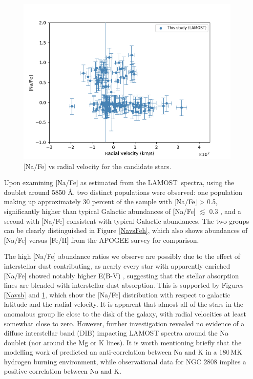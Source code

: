 \documentclass[a4paper,fleqn,usenatbib]{mnras}
\newcommand{\project}[1]{#1}
\newcommand{\lamost}{\project{LAMOST}}
\begin{document}
\begin{figure}
	\includegraphics[width=\columnwidth]{Navsradvel.png}
    \caption{[Na/Fe] vs radial velocity for the candidate stars.}
    \label{Navsradvel}
\end{figure}
Upon examining [Na/Fe] as estimated from the \lamost\ spectra, using the doublet around 5850 \AA, two distinct populations were observed: one population making up approximately 30 percent of the sample with [Na/Fe] > 0.5, significantly higher than typical Galactic abundances of [Na/Fe] $\lesssim$ 0.3 \citep{kobayashi2011}, and a second with [Na/Fe] consistent with typical Galactic abundances. The two groups can be clearly distinguished in Figure \ref{NavsFeh}, which also shows abundances of [Na/Fe] versus [Fe/H] from the APOGEE survey for comparison.

The high [Na/Fe] abundance ratios we observe are possibly due to the effect of interstellar dust contributing, as nearly every star with apparently enriched [Na/Fe] showed notably higher E(B-V) \citep{schlafly2011}, suggesting that the stellar absorption lines are blended with interstellar dust absorption. This is supported by Figures \ref{Navsb} and \ref{Navsradvel}, which show the [Na/Fe] distribution with respect to galactic latitude and the radial velocity. It is apparent that almost all of the stars in the anomalous group lie close to the disk of the galaxy, with radial velocities at least somewhat close to zero.
However, further investigation revealed no evidence of a diffuse interstellar band (DIB) impacting LAMOST spectra around the Na doublet (nor around the Mg or K lines). It is worth mentioning briefly that the modelling work of \cite{prantzos2017} predicted an anti-correlation between Na and K in a 180\,MK hydrogen burning environment, while observational data for NGC 2808 implies a positive correlation between Na and K.
\end{document}
